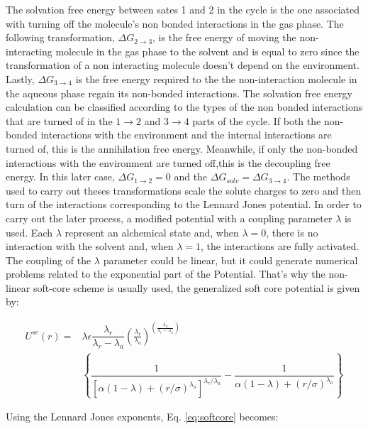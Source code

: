 The solvation free energy between sates 1 and 2 in the cycle is the one associated with turning off the molecule's non bonded interactions in the gas phase. The following transformation, $\Delta G_{2 \rightarrow 3}$, is the free energy of moving the non-interacting molecule in the gas phase to the solvent and is equal to zero since the transformation of a non interacting molecule doesn't depend on the environment. Lastly, $\Delta G_{3 \rightarrow 4}$ is the free energy required to the  the non-interaction molecule in the aqueous phase regain its non-bonded interactions.  The solvation free energy calculation can be classified according to the types of the non bonded interactions that are turned of in the $1 \rightarrow 2$ and $ 3 \rightarrow 4$ parts of the cycle. If both the non-bonded interactions with the environment and the internal interactions are turned of, this is the annihilation free energy. Meanwhile, if only the non-bonded interactions with the environment are turned off,this is the decoupling free energy. In this later case, $\Delta G_{1 \rightarrow 2} = 0$ and the $\Delta G_{solv} = \Delta G_{3 \rightarrow 4} $. The methods used to carry out theses transformations scale the solute charges to zero and then turn of the interactions corresponding to the Lennard Jones potential. In order to carry out the later process, a modified potential with a coupling parameter $\lambda$ is used. Each $\lambda$ represent an alchemical state and, when $\lambda=0$, there is no interaction with the solvent and, when $\lambda=1$, the interactions are fully activated. The coupling of the $\lambda$ parameter could be linear, but it could generate numerical problems related to the exponential part of the Potential. That's why the non-linear soft-core scheme \cite{beutler1994} is usually used, the generalized soft core potential is given by:

\begin{equation}
\label{eq:softcore}
\begin{aligned}
U^{sc}(r) {}=& \lambda\epsilon\dfrac{\lambda_r}{\lambda_r - \lambda_a} \left(\frac{\lambda_r}{\lambda_a} \right)^{\left( \frac{\lambda_a}{\lambda_r - \lambda_a} \right)} \\
& \left\lbrace\dfrac{1}{\left[\alpha(1-\lambda)+ (r/\sigma)^{\lambda_a}\right]^{\lambda_{r}/\lambda_{a}}} - \dfrac{1}{\alpha(1-\lambda)+(r/\sigma)^{\lambda_a}}\right\rbrace
\end{aligned}
\end{equation}

Using the Lennard Jones exponents, Eq. \eqref{eq:softcore} becomes:

